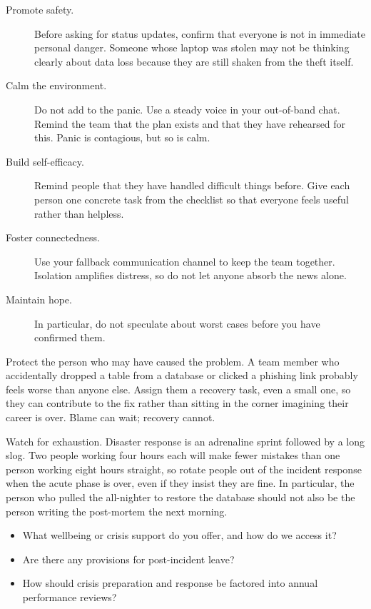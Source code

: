 \documentclass[10pt,letterpaper]{article}
\begin{document}
\begin{description}

\item[Promote safety.]
  Before asking for status updates, confirm that everyone is not in immediate
  personal danger.  Someone whose laptop was stolen may not be thinking clearly
  about data loss because they are still shaken from the theft itself.

\item[Calm the environment.]
  Do not add to the panic.  Use a steady voice in your out-of-band chat.  Remind
  the team that the plan exists and that they have rehearsed for this.  Panic is
  contagious, but so is calm.

\item[Build self-efficacy.]
  Remind people that they have handled difficult things before.  Give each person
  one concrete task from the checklist so that everyone feels useful rather than
  helpless.

\item[Foster connectedness.]
  Use your fallback communication channel to keep the team together.  Isolation
  amplifies distress, so do not let anyone absorb the news alone.

\item[Maintain hope.]
  In particular, do not speculate about worst cases before you have confirmed
  them.

\end{description}

Protect the person who may have caused the problem.  A team member who
accidentally dropped a table from a database or clicked a phishing link probably
feels worse than anyone else.  Assign them a recovery task, even a small one, so
they can contribute to the fix rather than sitting in the corner imagining their
career is over.  Blame can wait; recovery cannot.

Watch for exhaustion.  Disaster response is an adrenaline sprint followed by a
long slog.  Two people working four hours each will make fewer mistakes than one
person working eight hours straight, so rotate people out of the incident
response when the acute phase is over, even if they insist they are fine.  In
particular, the person who pulled the all-nighter to restore the database should
not also be the person writing the post-mortem the next morning.

\begin{notebox}
  \begin{itemize}
  \item What wellbeing or crisis support do you offer, and how do we access it?
  \item Are there any provisions for post-incident leave?
  \item How should crisis preparation and response be factored into annual
    performance reviews?
  \end{itemize}
\end{notebox}
\end{document}
